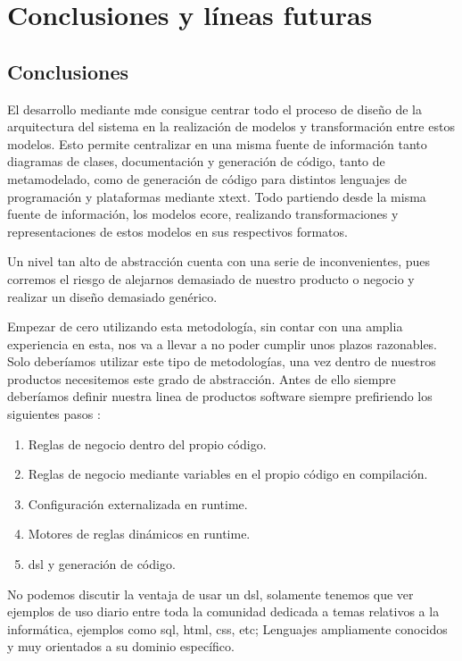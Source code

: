 \chapter{Conclusiones y líneas futuras}
 
\section{Conclusiones}

El desarrollo mediante \gls{mde} consigue centrar todo el proceso de diseño de la arquitectura del sistema en la realización de modelos y transformación entre estos modelos.
Esto permite centralizar en una misma fuente de información tanto diagramas de clases, documentación y generación de código, tanto de \gls{metamodelado}, como de generación de código para distintos lenguajes de programación y plataformas mediante \gls{xtext}. Todo partiendo desde la misma fuente de información, los modelos \gls{ecore}, realizando transformaciones y representaciones de estos modelos en sus respectivos formatos.

Un nivel tan alto de abstracción cuenta con una serie de inconvenientes, pues corremos el riesgo de alejarnos demasiado de nuestro producto o negocio y realizar un diseño demasiado genérico.

Empezar de cero utilizando esta metodología, sin contar con una amplia experiencia en esta, nos va a llevar a no poder cumplir unos plazos razonables. Solo deberíamos utilizar este tipo de metodologías, una vez dentro de nuestros productos necesitemos este grado de abstracción. Antes de ello siempre deberíamos definir nuestra linea de productos software siempre prefiriendo los siguientes pasos \cite{TheConfigurationComplexityClock}: 

\begin{enumerate}
\item Reglas de negocio dentro del propio código.
\item Reglas de negocio mediante variables en el propio código en compilación.
\item Configuración externalizada en \gls{runtime}.
\item Motores de reglas dinámicos en \gls{runtime}.
\item \gls{dsl} y generación de código.
\end{enumerate}


No podemos discutir la ventaja de usar un \gls{dsl}, solamente tenemos que ver ejemplos de uso diario entre toda la comunidad dedicada a temas relativos a la informática, ejemplos como \gls{sql}, \gls{html}, \gls{css}, etc; Lenguajes ampliamente conocidos y muy orientados a su dominio específico.

